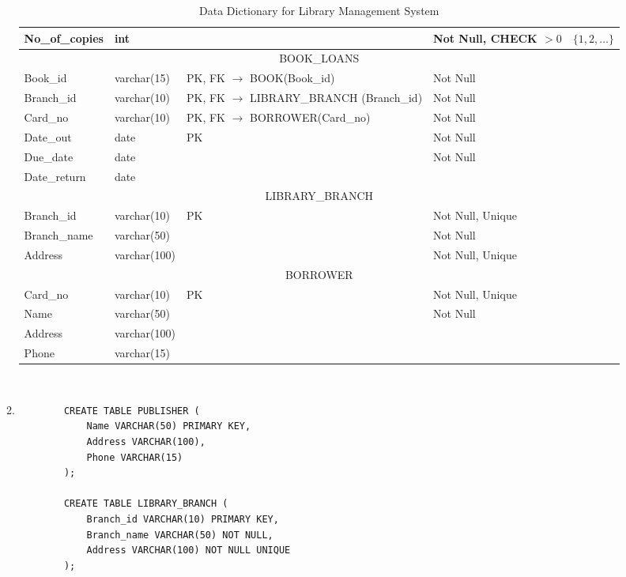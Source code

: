 \documentclass[12pt,a4paper]{article}
\begin{document}
\begin{enumerate}
\begin{enumerate}
\begin{table}[H]
{\begin{tabular}{|p{3cm}|p{2.5cm}|p{4.5cm}|p{4.5cm}|p{2cm}|}
        No\_of\_copies & int &  & Not Null, CHECK $> 0$ & $\{1,2,\dots\}$ \\
        \hline
        \multicolumn{5}{|c|}{BOOK\_LOANS} \\
        \hline
        Book\_id & varchar(15) & PK, FK $\rightarrow$ BOOK(Book\_id) & Not Null &  \\
        Branch\_id & varchar(10) & PK, FK $\rightarrow$ LIBRARY\_BRANCH (Branch\_id) & Not Null &  \\
        Card\_no & varchar(10) & PK, FK $\rightarrow$ BORROWER(Card\_no) & Not Null &  \\
        Date\_out & date & PK & Not Null &  \\
        Due\_date & date &  & Not Null &  \\
        Date\_return & date &  &  &  \\
        \hline
        \multicolumn{5}{|c|}{LIBRARY\_BRANCH} \\
        \hline
        Branch\_id & varchar(10) & PK & Not Null, Unique &  \\
        Branch\_name & varchar(50) &  & Not Null &  \\
        Address & varchar(100) &  & Not Null, Unique &  \\
        \hline
        \multicolumn{5}{|c|}{BORROWER} \\
        \hline
        Card\_no & varchar(10) & PK & Not Null, Unique &  \\
        Name & varchar(50) &  & Not Null &  \\
        Address & varchar(100) &  &  &  \\
        Phone & varchar(15) &  &  &  \\
        \hline
        \end{tabular}
        }
        \\
        \caption{Data Dictionary for Library Management System}
        \label{tab:data_dictionary}
        \end{table}
        \newpage
        \item 
        \begin{verbatim}
        CREATE TABLE PUBLISHER (
            Name VARCHAR(50) PRIMARY KEY,
            Address VARCHAR(100),
            Phone VARCHAR(15)
        );

        CREATE TABLE LIBRARY_BRANCH (
            Branch_id VARCHAR(10) PRIMARY KEY,
            Branch_name VARCHAR(50) NOT NULL,
            Address VARCHAR(100) NOT NULL UNIQUE
        );


\end{verbatim}
\end{enumerate}
\end{enumerate}
\end{document}
